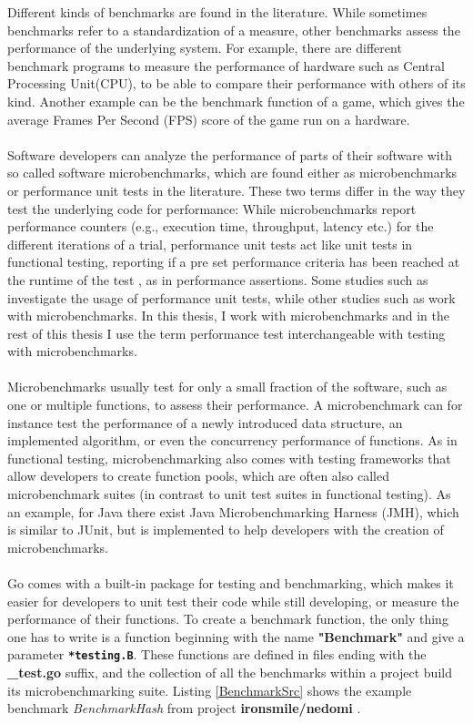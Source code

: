 \documentclass{seal_thesis}
\begin{document}
Different kinds of benchmarks are found in the literature. While sometimes benchmarks refer to a standardization of a measure, other benchmarks assess the performance of the underlying system. For example, there are different benchmark programs to measure the performance of hardware such as Central Processing Unit(CPU), to be able to compare their performance with others of its kind. Another example can be the benchmark function of a game, which gives the average Frames Per Second (FPS) score of the game run on a hardware.\\
\\
Software developers can analyze the performance of parts of their software with so called software microbenchmarks, which are found either as microbenchmarks or performance unit tests in the literature\cite{costa2019}. These two terms differ in the way they test the underlying code for performance: While microbenchmarks report performance counters (e.g., execution time, throughput, latency etc.) for the different iterations of a trial, performance unit tests act like unit tests in functional testing, reporting if a pre set performance criteria has been reached at the runtime of the test \cite{costa2019}, as in performance assertions. Some studies such as \cite{Stefan:2017:UTP:3030207.3030226}\cite{Horky:2015:UPU:2668930.2688051} investigate the usage of performance unit tests, while other studies such as \cite{Laaber:2018:EOS:3196398.3196407}\cite{rodriguez2016automatic} work with microbenchmarks. In this thesis, I work with microbenchmarks and in the rest of this thesis I use the term performance test interchangeable with testing with microbenchmarks.\\
\\
Microbenchmarks usually test for only a small fraction of the software, such as one or multiple functions, to assess their performance. A microbenchmark can for instance test the performance of a newly introduced data structure, an implemented algorithm, or even the concurrency performance of functions\cite{costa2019}. As in functional testing, microbenchmarking also comes with testing frameworks that allow developers to create function pools, which are often also called microbenchmark suites (in contrast to unit test suites in functional testing). As an example, for Java there exist Java Microbenchmarking Harness (JMH), which is similar to JUnit, but is implemented to help developers with the creation of microbenchmarks\cite{JMH}.\\
\\
Go comes with a built-in package for testing and benchmarking, which makes it easier for developers to unit test their code while still developing, or measure the performance of their functions\cite{gobench}. To create a benchmark function, the only thing one has to write is a function beginning with the name \textbf{"Benchmark"} and give a parameter \texttt{\textbf{*testing.B}}. These functions are defined in files ending with the \textbf{\_test.go} suffix, and the collection of all the benchmarks within a project build its microbenchmarking suite. Listing \ref{BenchmarkSrc} shows the example benchmark \textit{BenchmarkHash} from project \textbf{ironsmile/nedomi} \cite{ironsmile/nedomi}.
\end{document}
